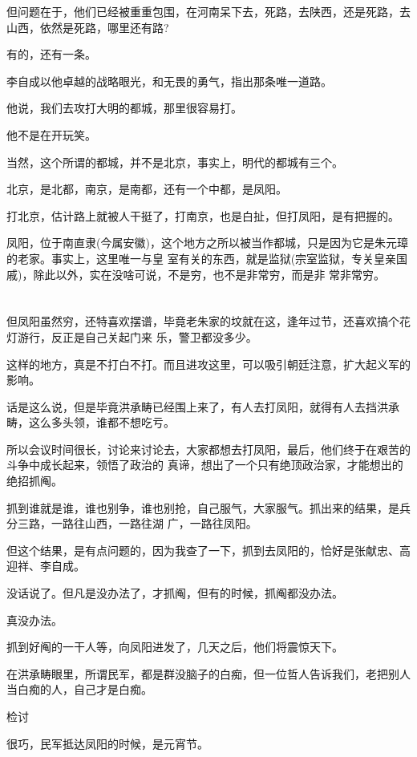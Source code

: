 \documentclass[11pt,a4paper,onecolumn]{article}
\begin{document}
但问题在于，他们已经被重重包围，在河南呆下去，死路，去陕西，还是死路，去山西，依然是死路，哪里还有路?

有的，还有一条。

李自成以他卓越的战略眼光，和无畏的勇气，指出那条唯一道路。

他说，我们去攻打大明的都城，那里很容易打。

他不是在开玩笑。

当然，这个所谓的都城，并不是北京，事实上，明代的都城有三个。

北京，是北都，南京，是南都，还有一个中都，是凤阳。

打北京，估计路上就被人干挺了，打南京，也是白扯，但打凤阳，是有把握的。

凤阳，位于南直隶(今属安徽)，这个地方之所以被当作都城，只是因为它是朱元璋的老家。事实上，这里唯一与皇
室有关的东西，就是监狱(宗室监狱，专关皇亲国戚)，除此以外，实在没啥可说，不是穷，也不是非常穷，而是非
常非常穷。

\section[\thesection]{}

但凤阳虽然穷，还特喜欢摆谱，毕竟老朱家的坟就在这，逢年过节，还喜欢搞个花灯游行，反正是自己关起门来
乐，警卫都没多少。

这样的地方，真是不打白不打。而且进攻这里，可以吸引朝廷注意，扩大起义军的影响。

话是这么说，但是毕竟洪承畴已经围上来了，有人去打凤阳，就得有人去挡洪承畴，这么多头领，谁都不想吃亏。

所以会议时间很长，讨论来讨论去，大家都想去打凤阳，最后，他们终于在艰苦的斗争中成长起来，领悟了政治的
真谛，想出了一个只有绝顶政治家，才能想出的绝招\myrule 抓阄。

抓到谁就是谁，谁也别争，谁也别抢，自己服气，大家服气。抓出来的结果，是兵分三路，一路往山西，一路往湖
广，一路往凤阳。

但这个结果，是有点问题的，因为我查了一下，抓到去凤阳的，恰好是张献忠、高迎祥、李自成。

没话说了。但凡是没办法了，才抓阄，但有的时候，抓阄都没办法。

真没办法。

抓到好阄的一干人等，向凤阳进发了，几天之后，他们将震惊天下。

在洪承畴眼里，所谓民军，都是群没脑子的白痴，但一位哲人告诉我们，老把别人当白痴的人，自己才是白痴。

检讨

很巧，民军抵达凤阳的时候，是元宵节。
\end{document}
